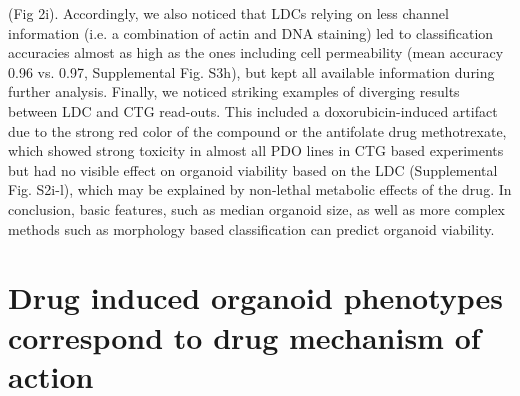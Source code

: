 \begin{flushleft}
(Fig 2i). Accordingly, we also noticed that LDCs relying on less channel information (i.e. a combination of actin and DNA staining) led to classification accuracies almost as high as the ones including cell permeability (mean accuracy 0.96 vs. 0.97, Supplemental Fig. S3h), but kept all available information during further analysis. Finally, we noticed striking examples of diverging results between LDC and CTG read-outs. This included a doxorubicin-induced artifact due to the strong red color of the compound or the antifolate drug methotrexate, which showed strong toxicity in almost all PDO lines in CTG based experiments but had no visible effect on organoid viability based on the LDC (Supplemental Fig. S2i-l), which may be explained by non-lethal metabolic effects of the drug. In conclusion, basic features, such as median organoid size, as well as more complex methods such as morphology based classification can predict organoid viability. 

\section{Drug induced organoid phenotypes correspond to drug mechanism of action}


\end{flushleft}
